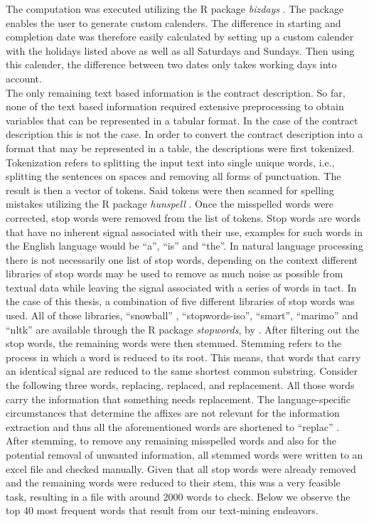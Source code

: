 \documentclass[a4paper,12pt, headsepline]{scrartcl}
\numberwithin{equation}{section}
\begin{document}
 The computation was executed utilizing the R package \textit{bizdays} \citep{bizdays}. The package enables the user to generate custom calenders. The difference in starting and completion date was therefore easily calculated by setting up a custom calender with the holidays listed above as well as all Saturdays and Sundays. Then using this calender, the difference between two dates only takes working days into account.\\
 The only remaining text based information is the contract description. So far, none of the text based information required extensive preprocessing to obtain variables that can be represented in a tabular format. In the case of the contract description this is not the case. In order to convert the contract description into a format that may be represented in a table, the descriptions were first tokenized. Tokenization refers to splitting the input text into single unique words, i.e., splitting the sentences on spaces and removing all forms of punctuation. The result is then a vector of tokens. Said tokens were then scanned for spelling mistakes utilizing the R package \textit{hunspell} \citep{hunspell}. Once the misspelled words were corrected, stop words were removed from the list of tokens. Stop words are words that have no inherent signal associated with their use, examples for such words in the English language would be \enquote{a}, \enquote{is} and \enquote{the}. In natural language processing there is not necessarily one list of stop words, depending on the context different libraries of stop words may be used to remove as much noise as possible from textual data while leaving the signal associated with a series of words in tact. In the case of this thesis, a combination of five different libraries of stop words was used. All of those libraries, \enquote{snowball} , \enquote{stopwords-iso}, 
 \enquote{smart}, \enquote{marimo} and \enquote{nltk} are available through the R package \textit{stopwords}, by \citet{stopwords}. After filtering out the stop words, the remaining words were then stemmed. Stemming refers to the process in which a word is reduced to its root. This means, that words that carry an identical signal are reduced to the same shortest common substring. Consider the following three words, replacing, replaced, and replacement. All those words carry the information that something needs replacement. The language-specific circumstances that determine the affixes are not relevant for the information extraction and thus all the aforementioned words are shortened to \enquote{replac} \citep{textminingR}. After stemming, to remove any remaining misspelled words and also for the potential removal of unwanted information, all stemmed words were written to an excel file and checked manually. Given that all stop words were already removed and the remaining words were reduced to their stem, this was a very feasible task, resulting in a file with around 2000 words to check. Below we observe the top 40 most frequent words that result from our text-mining endeavors.
 
\end{document}
